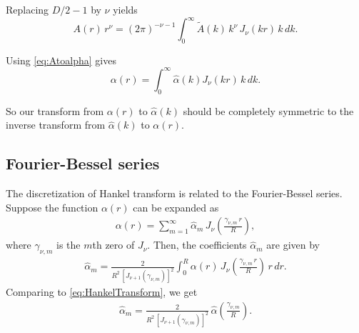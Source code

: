 \documentclass[preprint]{revtex4-1}
\numberwithin{equation}{subsection}
\numberwithin{table}{section}
\begin{document}
Replacing $D/2 - 1$ by $\nu$ yields
\[
A(r) \, r^\nu
=
(2\pi)^{-\nu-1}
\int_0^\infty \tilde{A}(k) \, k^\nu \, J_\nu(kr) \, k \, dk.
\]

Using \eqref{eq:Atoalpha} gives
\begin{equation}
\alpha(r)
=
\int_0^\infty \hat \alpha(k) J_\nu(kr) \, k \, dk.
\label{eq:inverseHankelTransform}
\end{equation}

So our transform from $\alpha(r)$ to $\hat\alpha(k)$
should be completely symmetric to the inverse transform
from $\hat\alpha(k)$ to $\alpha(r)$.



\subsection{Fourier-Bessel series}

The discretization of Hankel transform
is related to the Fourier-Bessel series\cite{arfken}.
%
Suppose the function $\alpha(r)$ can be expanded as
%
\begin{align}
\alpha(r) = \sum_{m = 1}^\infty \hat\alpha_m \,
  J_\nu\left(
    \frac{ \gamma_{\nu, m} \, r } { R }
  \right),
  \label{eq:FourierBesselSeries}
\end{align}
%
where $\gamma_{\nu, m}$ is the $m$th zero of $J_\nu$.
%
Then, the coefficients $\hat\alpha_m$ are given by
%
\begin{align}
\hat\alpha_m
=
\frac{ 2 } { R^2 \, \left[ J_{\nu+1}(\gamma_{\nu, m}) \right]^2 }
\int_0^R \alpha(r) \, J_\nu\left(
    \frac{ \gamma_{\nu, m} \, r } { R }
  \right) \, r \, dr.
  \label{eq:FourierBesselSeries_cm}
\end{align}
%
Comparing to \eqref{eq:HankelTransform},
we get
\begin{align}
  \hat\alpha_m
=
  \frac{ 2 } { R^2 \, [J_{\nu + 1}(\gamma_{\nu, m})]^2 }
  \,
  \hat\alpha
  \left(
    \frac{ \gamma_{\nu, m} } { R }
  \right).
  \label{eq:twoalphahats}
\end{align}
\end{document}
